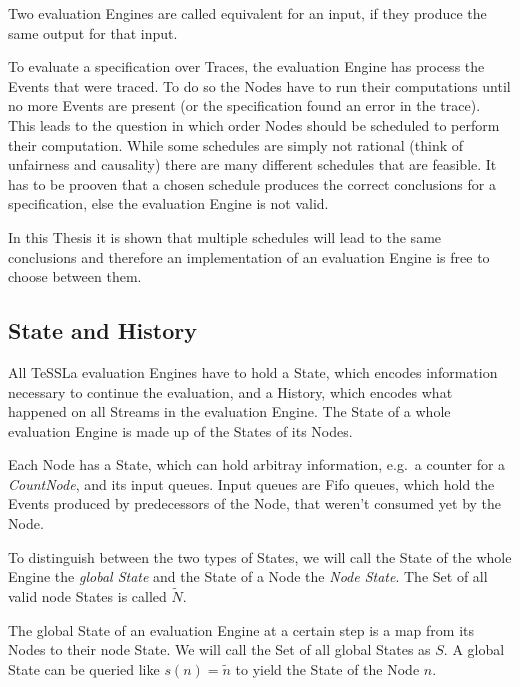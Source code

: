 \begin{definition}[name=Equivalence of evaluation Engines for an input]\label{def:equivalence_eval_engine_specific}
  Two evaluation Engines are called equivalent for an input, if they produce the same output for that input.
\end{definition}

To evaluate a specification over Traces, the evaluation Engine has process the Events that were traced.
To do so the Nodes have to run their computations until no more Events are present (or the specification found an error in the trace).
This leads to the question in which order Nodes should be scheduled to perform their computation.
While some schedules are simply not rational (think of unfairness and causality) there are many different schedules that are feasible.
It has to be prooven that a chosen schedule produces the correct conclusions for a specification, else the evaluation Engine is not valid.

In this Thesis it is shown that multiple schedules will lead to the same conclusions and therefore an implementation of an evaluation Engine is free to choose between them.

\subsection{State and History}
\label{sec:concepts:def:state}

All TeSSLa evaluation Engines have to hold a State, which encodes information necessary to continue the evaluation, and a History, which encodes what happened on all Streams in the evaluation Engine.
The State of a whole evaluation Engine is made up of the States of its Nodes.

Each Node has a State, which can hold arbitray information, e.g.\ a counter for a \emph{CountNode}, and its input queues.
Input queues are Fifo queues, which hold the Events produced by predecessors of the Node, that weren't consumed yet by the Node.

To distinguish between the two types of States, we will call the State of the whole Engine the \emph{global State} and the State of a Node the \emph{Node State}.
The Set of all valid node States is called \(\widetilde{N}\).

The global State of an evaluation Engine at a certain step is a map from its Nodes to their node State.
We will call the Set of all global States as \(S\).
A global State can be queried like \(s(n) = \widetilde{n}\) to yield the State of the Node \(n\).

